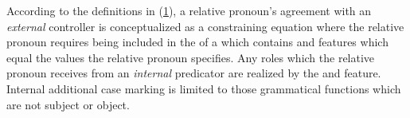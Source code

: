\begin{figure}
\begin{morphlex}
\ex\label{ex:relpromorphlex}
\xe
\end{morphlex}
\end{figure}

According to the definitions in (\ref{ex:relpromorphlex}), a relative pronoun's
agreement with an \emph{external} controller is conceptualized as a
constraining equation where the relative pronoun requires being included in the
\Adjc{} of a \GF{} which contains \Case{} and \Anim{} features which equal the
values the relative pronoun specifies. Any roles which the relative pronoun
receives from an \emph{internal} predicator are realized by the \Case{} and
\Anim{} feature. Internal additional case marking is limited to those
grammatical functions which are not subject or object.

